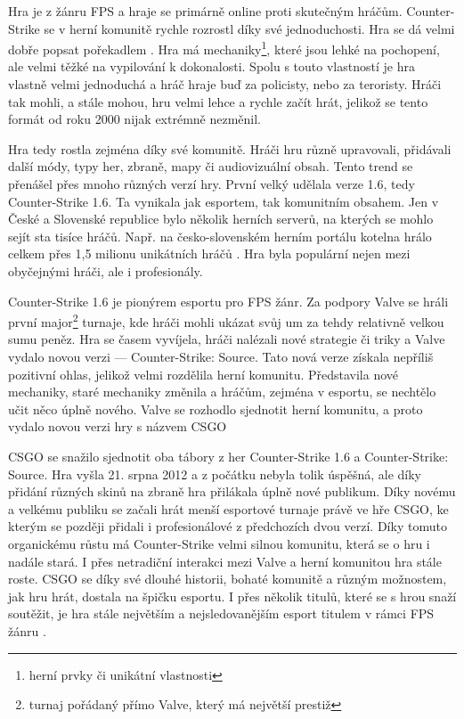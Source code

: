 Hra je z žánru \ac{FPS} a hraje se primárně online proti skutečným hráčům. Counter-Strike se v herní komunitě rychle rozrostl díky své jednoduchosti.
Hra se dá velmi dobře popsat pořekadlem . Hra má mechaniky\footnote{herní prvky či unikátní vlastnosti},
které jsou lehké na pochopení, ale velmi těžké na vypilování k dokonalosti. Spolu s touto vlastností je hra vlastně velmi jednoduchá a hráč hraje buď za policisty, nebo za
teroristy. Hráči tak mohli, a stále mohou, hru velmi lehce a rychle začít hrát, jelikož se tento formát od roku 2000 nijak extrémně nezměnil.

Hra tedy rostla zejména díky své komunitě. Hráči hru různě upravovali, přidávali další módy, typy her, zbraně, mapy či audiovizuální obsah. Tento trend se přenášel přes
mnoho různých verzí hry. První velký  udělala verze 1.6, tedy Counter-Strike 1.6. Ta vynikala jak esportem, tak komunitním obsahem. Jen v České a
Slovenské republice bylo několik herních serverů, na kterých se mohlo sejít sta tisíce hráčů. Např. na česko-slovenském herním portálu kotelna hrálo celkem přes
1,5 milionu unikátních hráčů \cite{cskocs_kotelna_2022}. Hra byla populární nejen mezi obyčejnými hráči, ale i profesionály.

Counter-Strike 1.6 je pionýrem esportu pro \ac{FPS} žánr. Za podpory Valve se hráli první major\footnote{turnaj pořádaný přímo Valve, který má největší prestiž} turnaje,
kde hráči mohli ukázat svůj um za tehdy relativně velkou sumu peněz. Hra se časem vyvíjela, hráči nalézali nové strategie či triky a Valve vydalo novou verzi ---  Counter-Strike:
Source. Tato nová verze získala nepříliš pozitivní ohlas, jelikož velmi rozdělila herní komunitu. Představila nové mechaniky, staré mechaniky změnila a hráčům, zejména v esportu,
se nechtělo učit něco úplně nového. Valve se rozhodlo sjednotit herní komunitu, a proto vydalo novou verzi hry
s názvem \ac{CSGO}

\ac{CSGO} se snažilo sjednotit oba tábory z her 
Counter-Strike 1.6 a Counter-Strike: Source. Hra vyšla 21. srpna 2012 a z počátku nebyla tolik úspěšná, ale díky přidání různých
skinů \cite{valve_counterstrike_2013} na zbraně hra přilákala úplně nové publikum. Díky novému a velkému publiku se začali hrát menší esportové turnaje právě ve hře \ac{CSGO}, ke kterým se
později přidali i profesionálové z předchozích dvou verzí. Díky tomuto organickému růstu má Counter-Strike velmi silnou komunitu, která se o hru i nadále stará. I přes
netradiční interakci mezi Valve a herní komunitou hra stále roste. \ac{CSGO} se díky své dlouhé historii, bohaté komunitě a různým možnostem, jak hru hrát, dostala na špičku
esportu. I přes několik titulů, které se s hrou snaží soutěžit, je hra stále největším a nejsledovanějším esport titulem v rámci \ac{FPS} žánru \cite{henningson_history_2020}.

